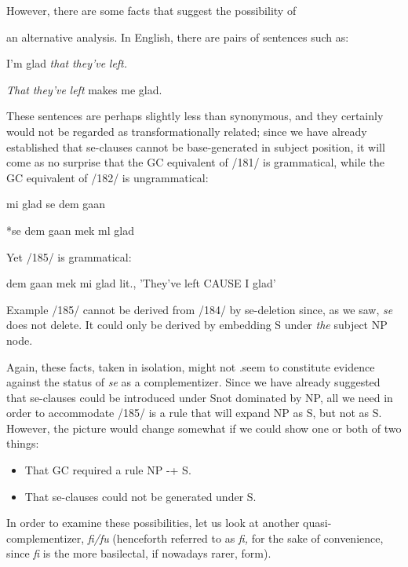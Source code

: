 However, there are some facts that suggest the possibility of


an alternative analysis. In English, there are pairs of sentences such as:

\ea\label{ex:181}
 I'm glad \textit{that} \textit{they've} \textit{left.}
\z

\ea\label{ex:182}
 \textit{That} \textit{they've} \textit{left} makes me glad.
\z

These sentences are perhaps slightly less than synonymous, and they certainly would not be regarded as transformationally related; since we have already established that se-clauses cannot be base-generated in subject position, it will come as no surprise that the GC equivalent of /181/ is grammatical, while the GC equivalent of /182/ is ungrammatical:

\ea\label{ex:183}
 mi glad se dem gaan
\z

\ea\label{ex:184}
 *se dem gaan mek ml glad 
\z

Yet /185/ is grammatical:

\ea\label{ex:185}
 dem gaan mek mi glad
\glt  lit., 'They've left CAUSE I glad'
\z

Example /185/ cannot be derived from /184/ by se-deletion since, as we saw, \textit{se} does not delete. It could only be derived by embedding S under \textit{the} subject NP node.

Again, these facts, taken in isolation, might not .seem to con\-stitute evidence against the status of \textit{se} as a complementizer. Since we have already suggested that se-clauses could be introduced under Snot dominated by NP, all we need in order to accommodate /185/ is a rule that will expand NP as S, but not as S. However, the picture would change somewhat if we could show one or both of two things:

\begin{itemize}
\item That GC required a rule NP {}-+ S.
\item That se-clauses could not be generated under S.
\end{itemize}

In order to examine these possibilities, let us look at another quasi{}-
complementizer, \textit{fi/fu} (henceforth referred to as \textit{fi,} for the sake of convenience, since \textit{fi} is the more basilectal, if nowadays rarer, form).

